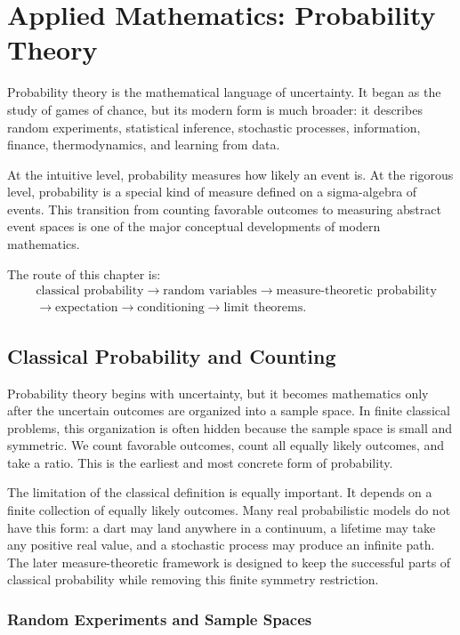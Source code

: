 \chapter{Applied Mathematics: Probability Theory}

Probability theory is the mathematical language of uncertainty. It began as the study of games of chance, but its modern form is much broader: it describes random experiments, statistical inference, stochastic processes, information, finance, thermodynamics, and learning from data.

At the intuitive level, probability measures how likely an event is. At the rigorous level, probability is a special kind of measure defined on a sigma-algebra of events. This transition from counting favorable outcomes to measuring abstract event spaces is one of the major conceptual developments of modern mathematics.

The route of this chapter is:
\[
    \begin{aligned}
        &\text{classical probability} \to \text{random variables} \to \text{measure-theoretic probability} \\
        &\to \text{expectation} \to \text{conditioning} \to \text{limit theorems}.
    \end{aligned}
\]

\section{Classical Probability and Counting}


Probability theory begins with uncertainty, but it becomes mathematics only after the uncertain outcomes are organized into a sample space. In finite classical problems, this organization is often hidden because the sample space is small and symmetric. We count favorable outcomes, count all equally likely outcomes, and take a ratio. This is the earliest and most concrete form of probability.

The limitation of the classical definition is equally important. It depends on a finite collection of equally likely outcomes. Many real probabilistic models do not have this form: a dart may land anywhere in a continuum, a lifetime may take any positive real value, and a stochastic process may produce an infinite path. The later measure-theoretic framework is designed to keep the successful parts of classical probability while removing this finite symmetry restriction.

\subsection{Random Experiments and Sample Spaces}

